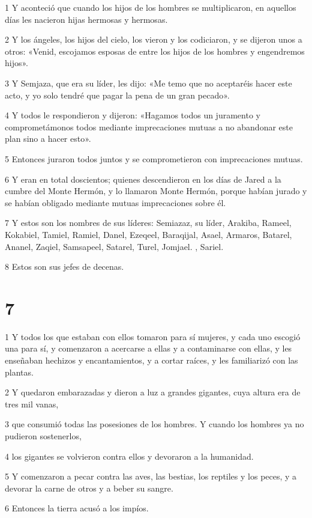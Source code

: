 \par 1 Y aconteció que cuando los hijos de los hombres se multiplicaron, en aquellos días les nacieron hijas hermosas y hermosas.
\par 2 Y los ángeles, los hijos del cielo, los vieron y los codiciaron, y se dijeron unos a otros: «Venid, escojamos esposas de entre los hijos de los hombres y engendremos hijos».
\par 3 Y Semjaza, que era su líder, les dijo: «Me temo que no aceptaréis hacer este acto, y yo solo tendré que pagar la pena de un gran pecado».
\par 4 Y todos le respondieron y dijeron: «Hagamos todos un juramento y comprometámonos todos mediante imprecaciones mutuas a no abandonar este plan sino a hacer esto».
\par 5 Entonces juraron todos juntos y se comprometieron con imprecaciones mutuas.
\par 6 Y eran en total doscientos; quienes descendieron en los días de Jared a la cumbre del Monte Hermón, y lo llamaron Monte Hermón, porque habían jurado y se habían obligado mediante mutuas imprecaciones sobre él.
\par 7 Y estos son los nombres de sus líderes: Semiazaz, su líder, Arakiba, Rameel, Kokabiel, Tamiel, Ramiel, Danel, Ezeqeel, Baraqijal, Asael, Armaros, Batarel, Ananel, Zaqiel, Samsapeel, Satarel, Turel, Jomjael. , Sariel.
\par 8 Estos son sus jefes de decenas.

\chapter{7}

\par 1 Y todos los que estaban con ellos tomaron para sí mujeres, y cada uno escogió una para sí, y comenzaron a acercarse a ellas y a contaminarse con ellas, y les enseñaban hechizos y encantamientos, y a cortar raíces, y les familiarizó con las plantas.
\par 2 Y quedaron embarazadas y dieron a luz a grandes gigantes, cuya altura era de tres mil vanas,
\par 3 que consumió todas las posesiones de los hombres. Y cuando los hombres ya no pudieron sostenerlos,
\par 4 los gigantes se volvieron contra ellos y devoraron a la humanidad.
\par 5 Y comenzaron a pecar contra las aves, las bestias, los reptiles y los peces, y a devorar la carne de otros y a beber su sangre.
\par 6 Entonces la tierra acusó a los impíos.

